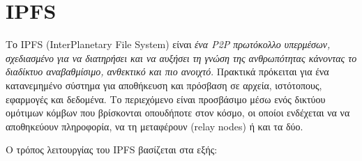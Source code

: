 \section{IPFS} \label{section:2-7-ipfs}


Το IPFS (InterPlanetary File System) είναι \textit{ένα P2P πρωτόκολλο υπερμέσων, σχεδιασμένο για να διατηρήσει και να αυξήσει τη γνώση της ανθρωπότητας κάνοντας το διαδίκτυο αναβαθμίσιμο, ανθεκτικό και πιο ανοιχτό}.\cite{2.7-ipfs}
Πρακτικά πρόκειται για ένα κατανεμημένο σύστημα για αποθήκευση και πρόσβαση σε αρχεία, ιστότοπους, εφαρμογές και δεδομένα. Το περιεχόμενο είναι προσβάσιμο μέσω ενός δικτύου ομότιμων κόμβων που βρίσκονται οπουδήποτε στον κόσμο, οι οποίοι ενδέχεται να να αποθηκεύουν πληροφορία, να τη μεταφέρουν (relay nodes) ή και τα δύο.\cite{2.7-ipfs-docs}

Ο τρόπος λειτουργίας του IPFS βασίζεται στα εξής:

